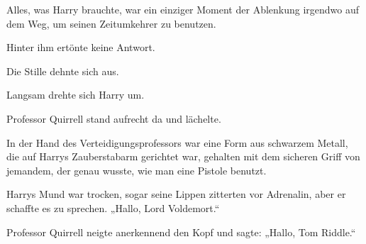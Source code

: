 Alles, was Harry brauchte, war ein einziger Moment der Ablenkung irgendwo auf dem Weg, um seinen Zeitumkehrer zu benutzen.

Hinter ihm ertönte keine Antwort.

Die Stille dehnte sich aus.

Langsam drehte sich Harry um.

Professor Quirrell stand aufrecht da und lächelte.

In der Hand des Verteidigungsprofessors war eine Form aus schwarzem Metall, die auf Harrys Zauberstabarm gerichtet war, gehalten mit dem sicheren Griff von jemandem, der genau wusste, wie man eine Pistole benutzt.

Harrys Mund war trocken, sogar seine Lippen zitterten vor Adrenalin, aber er schaffte es zu sprechen.
„Hallo, Lord Voldemort.“

Professor Quirrell neigte anerkennend den Kopf und sagte:
„Hallo, Tom Riddle.“

